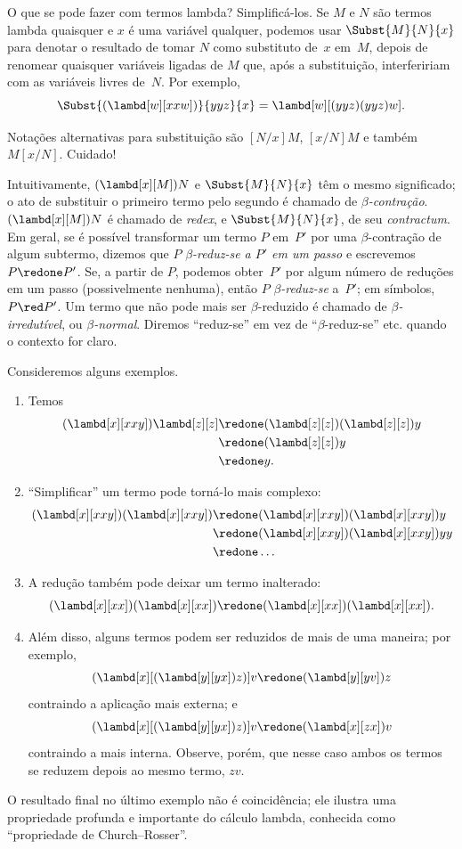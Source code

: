 \documentclass[../../../include/open-logic-section]{subfiles}
\begin{document}

O que se pode fazer com termos lambda? Simplificá-los. Se $M$ e $N$ são
termos lambda quaisquer e $x$ é uma variável qualquer, podemos usar
$\Subst{M}{N}{x}$ para denotar o resultado de tomar $N$ como substituto de~$x$
em~$M$, depois de renomear quaisquer variáveis ligadas de $M$ que, após a
substituição, interfeririam com as variáveis livres de~$N$. Por exemplo,
\[
\Subst{(\lambd[w][xxw])}{yyz}{x} = \lambd[w][(yyz)(yyz)w].
\]

\begin{digress}
Notações alternativas para substituição são $[N/x]M$, $[x/N]M$ e também
$M[x/N]$. Cuidado!
\end{digress}

Intuitivamente, $(\lambd[x][M])N$ e $\Subst{M}{N}{x}$ têm o mesmo
significado; o ato de substituir o primeiro termo pelo segundo é chamado de
\emph{$\beta$-contração}. $(\lambd[x][M])N$ é chamado de \emph{redex}, e
$\Subst{M}{N}{x}$, de seu \emph{contractum}. Em geral, se é possível
transformar um termo $P$ em~$P'$ por uma $\beta$-contração de algum
subtermo, dizemos que $P$ \emph{$\beta$-reduz-se a $P'$ em um passo} e
escrevemos $P \redone P'$. Se, a partir de $P$, podemos obter~$P'$ por algum
número de reduções em um passo (possivelmente nenhuma), então $P$
\emph{$\beta$-reduz-se} a~$P'$; em símbolos, $P \red P'$. Um termo que não
pode mais ser $\beta$-reduzido é chamado de \emph{$\beta$-irredutível}, ou
\emph{$\beta$-normal}. Diremos ``reduz-se'' em vez de
``$\beta$-reduz-se'' etc. quando o contexto for claro.

Consideremos alguns exemplos.
\begin{enumerate}
\item Temos
\begin{align*}
(\lambd[x][xxy]) \lambd[z][z] & \redone (\lambd[z][z])(\lambd[z][z]) y \\
& \redone (\lambd[z][z]) y \\
& \redone y.
\end{align*}
\item ``Simplificar'' um termo pode torná-lo mais complexo:
\begin{align*}
(\lambd[x][xxy])(\lambd[x][xxy]) & \redone (\lambd[x][xxy])(\lambd[x][xxy])y \\
& \redone (\lambd[x][xxy])(\lambd[x][xxy])yy \\
& \redone \dots
\end{align*}
\item A redução também pode deixar um termo inalterado:
\[
(\lambd[x][xx])(\lambd[x][xx]) \redone (\lambd[x][xx])(\lambd[x][xx]).
\]
\item Além disso, alguns termos podem ser reduzidos de mais de uma maneira;
  por exemplo,
\[
(\lambd[x][(\lambd[y][yx]) z)] v \redone (\lambd[y][yv]) z
\]
contraindo a aplicação mais externa; e
\[
(\lambd[x][(\lambd[y][yx]) z)] v \redone (\lambd[x][zx]) v
\]
contraindo a mais interna. Observe, porém, que nesse caso ambos os termos se
reduzem depois ao mesmo termo, $zv$.
\end{enumerate}

O resultado final no último exemplo não é coincidência; ele ilustra uma
propriedade profunda e importante do cálculo lambda, conhecida como
``propriedade de Church--Rosser''.
\end{document}
